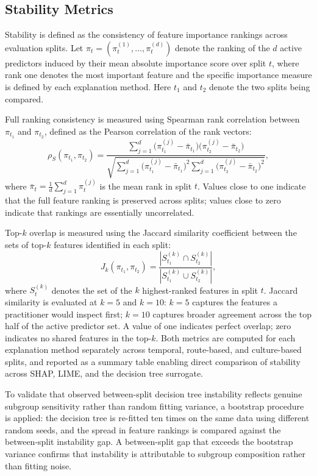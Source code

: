 \documentclass[oneside]{memoir} %
\begin{document}
\subsection{Stability Metrics}

Stability is defined as the consistency of feature importance rankings across evaluation splits. Let $\pi_t = (\pi_t^{(1)}, \ldots, \pi_t^{(d)})$ denote the ranking of the $d$ active predictors induced by their mean absolute importance score over split $t$, where rank one denotes the most important feature and the specific importance measure is defined by each explanation method. Here $t_1$ and $t_2$ denote the two splits being compared.

Full ranking consistency is measured using Spearman rank correlation between $\pi_{t_1}$ and $\pi_{t_2}$, defined as the Pearson correlation of the rank vectors:
\[
\rho_S(\pi_{t_1}, \pi_{t_2}) =
\frac{\sum_{j=1}^{d}\bigl(\pi_{t_1}^{(j)} - \bar{\pi}_{t_1}\bigr)
\bigl(\pi_{t_2}^{(j)} - \bar{\pi}_{t_2}\bigr)} {\sqrt{\sum_{j=1}^{d}\bigl(\pi_{t_1}^{(j)} - \bar{\pi}_{t_1}\bigr)^2
\sum_{j=1}^{d}\bigl(\pi_{t_2}^{(j)} - \bar{\pi}_{t_2}\bigr)^2}},
\]
where $\bar{\pi}_{t} = \frac{1}{d}\sum_{j=1}^{d}\pi_t^{(j)}$ is the mean rank in split $t$. Values close to one indicate that the full feature ranking is preserved across splits; values close to zero indicate that rankings are essentially uncorrelated.

Top-$k$ overlap is measured using the Jaccard similarity coefficient between the sets of top-$k$ features identified in each split:
\[
J_k(\pi_{t_1}, \pi_{t_2}) = \frac{|S_{t_1}^{(k)} \cap S_{t_2}^{(k)}|}{|S_{t_1}^{(k)} \cup S_{t_2}^{(k)}|},
\]
where $S_t^{(k)}$ denotes the set of the $k$ highest-ranked features in split $t$. Jaccard similarity is evaluated at $k = 5$ and $k = 10$: $k = 5$ captures the features a practitioner would inspect first; $k = 10$ captures broader agreement across the top half of the active predictor set. A value of one indicates perfect overlap; zero indicates no shared features in the top-$k$. Both metrics are computed for each explanation method separately across temporal, route-based, and culture-based splits, and reported as a summary table enabling direct comparison of stability across SHAP, LIME, and the decision tree surrogate.

To validate that observed between-split decision tree instability reflects genuine subgroup sensitivity rather than random fitting variance, a bootstrap procedure is applied: the decision tree is re-fitted ten times on the same data using different random seeds, and the spread in feature rankings is compared against the between-split instability gap. A between-split gap that exceeds the bootstrap variance confirms that instability is attributable to subgroup composition rather than fitting noise.
\end{document}
